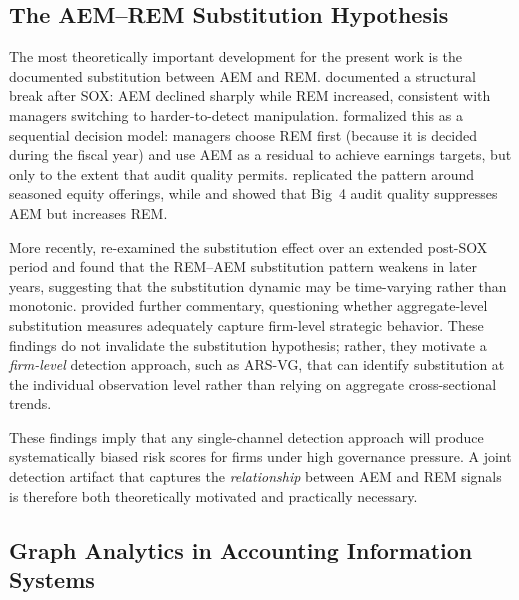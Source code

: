 \documentclass[12pt]{article}
\begin{document}
\subsection*{The AEM--REM Substitution Hypothesis}

The most theoretically important development for the present work is the
documented substitution between AEM and REM.  \citet{cohen2008} documented a
structural break after SOX: AEM declined sharply while REM increased,
consistent with managers switching to harder-to-detect manipulation.
\citet{zang2012} formalized this as a sequential decision model: managers
choose REM first (because it is decided during the fiscal year) and use AEM as
a residual to achieve earnings targets, but only to the extent that audit
quality permits.  \citet{cohen2010} replicated the pattern around seasoned
equity offerings, while \citet{ho2015} and \citet{chi2011} showed that Big~4
audit quality suppresses AEM but increases REM.

More recently, \citet{pincus2022} re-examined the substitution effect over an
extended post-SOX period and found that the REM--AEM substitution pattern
weakens in later years, suggesting that the substitution dynamic may be
time-varying rather than monotonic.  \citet{cohenlys2022} provided further
commentary, questioning whether aggregate-level substitution measures
adequately capture firm-level strategic behavior.  These findings do not
invalidate the substitution hypothesis; rather, they motivate a
\emph{firm-level} detection approach, such as ARS-VG, that can identify
substitution at the individual observation level rather than relying on
aggregate cross-sectional trends.

These findings imply that any single-channel detection approach will produce
systematically biased risk scores for firms under high governance pressure.  A
joint detection artifact that captures the \emph{relationship} between AEM and
REM signals is therefore both theoretically motivated and practically necessary.

\subsection*{Graph Analytics in Accounting Information Systems}
\end{document}

